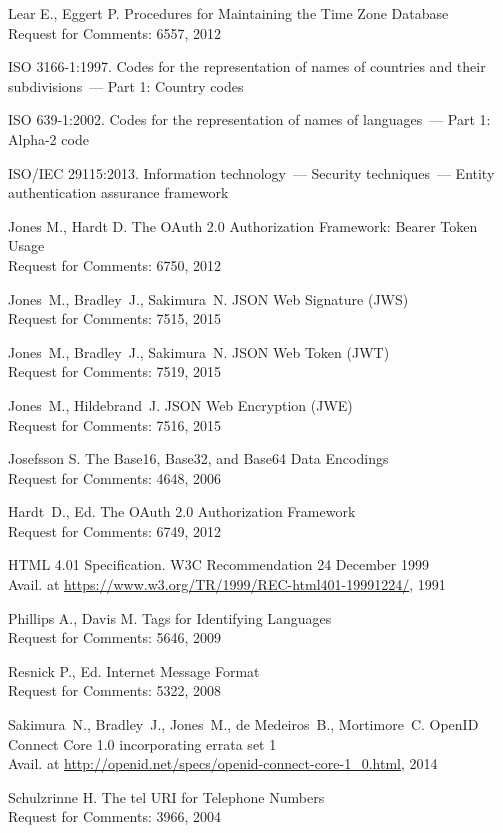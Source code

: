 \begin{thebibliography}{99}
Lear E., Eggert P.
Procedures for Maintaining the Time Zone Database\\
{\small Request for Comments: 6557, 2012}

ISO 3166-1:1997. Codes for the representation of names of
countries and their subdivisions~--- Part 1: Country codes

ISO 639-1:2002. Codes for the representation of names of languages~---
Part 1: Alpha-2 code


ISO/IEC 29115:2013. Information technology~---
Security techniques~--– Entity authentication assurance framework

Jones M., Hardt D.
The OAuth 2.0 Authorization Framework: Bearer Token Usage\\
{\small Request for Comments: 6750, 2012}

Jones~M., Bradley~J., Sakimura~N. 
JSON Web Signature (JWS)\\
{\small Request for Comments: 7515, 2015}

Jones~M., Bradley~J., Sakimura~N. 
JSON Web Token (JWT)\\
{\small Request for Comments: 7519, 2015}

Jones~M., Hildebrand~J. 
JSON Web Encryption (JWE)\\
{\small Request for Comments: 7516, 2015}

Josefsson S. 
The Base16, Base32, and Base64 Data Encodings\\
{\small Request for Comments: 4648, 2006}

Hardt~D., Ed.
The OAuth 2.0 Authorization Framework\\
{\small Request for Comments: 6749, 2012}

HTML 4.01 Specification. 
W3C Recommendation 24 December 1999\\
{\small Avail. at 
\url{https://www.w3.org/TR/1999/REC-html401-19991224/}, 1991}

Phillips A., Davis M. 
Tags for Identifying Languages\\
{\small Request for Comments: 5646, 2009}

Resnick P., Ed. 
Internet Message Format\\
{\small Request for Comments: 5322, 2008}

Sakimura~N., Bradley~J., Jones~M., de Medeiros~B., Mortimore~C. 
OpenID Connect Core 1.0 incorporating errata set 1\\
{\small Avail. at 
\url{http://openid.net/specs/openid-connect-core-1_0.html}, 2014}

Schulzrinne H. 
The tel URI for Telephone Numbers\\
{\small Request for Comments: 3966, 2004}

\end{thebibliography}
